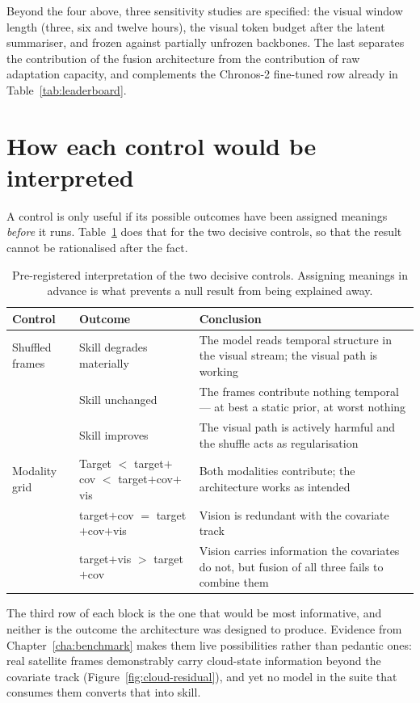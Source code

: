 Beyond the four above, three sensitivity studies are specified: the visual window length
(three, six and twelve hours), the visual token budget after the latent summariser, and
frozen against partially unfrozen backbones. The last separates the contribution of the
fusion architecture from the contribution of raw adaptation capacity, and complements the
Chronos-2 fine-tuned row already in Table~\ref{tab:leaderboard}.

\section{How each control would be interpreted}
\label{sec:control-logic}

A control is only useful if its possible outcomes have been assigned meanings \emph{before}
it runs. Table~\ref{tab:control-logic} does that for the two decisive controls, so that the
result cannot be rationalised after the fact.

\begin{table}[h!]
\centering
\small
\begin{tabular}{p{3.4cm} p{4.6cm} p{5.4cm}}
\hline
\textbf{Control} & \textbf{Outcome} & \textbf{Conclusion} \\
\hline
Shuffled frames & Skill degrades materially & The model reads temporal structure in the
visual stream; the visual path is working \\
 & Skill unchanged & The frames contribute nothing temporal --- at best a static prior, at
worst nothing \\
 & Skill improves & The visual path is actively harmful and the shuffle acts as
regularisation \\
\hline
Modality grid & Target $<$ target$+$cov $<$ target$+$cov$+$vis & Both modalities contribute;
the architecture works as intended \\
 & target$+$cov $=$ target$+$cov$+$vis & Vision is redundant with the covariate track \\
 & target$+$vis $>$ target$+$cov & Vision carries information the covariates do not, but
fusion of all three fails to combine them \\
\hline
\end{tabular}
\caption{Pre-registered interpretation of the two decisive controls. Assigning meanings in
advance is what prevents a null result from being explained away.}
\label{tab:control-logic}
\end{table}

The third row of each block is the one that would be most informative, and neither is the
outcome the architecture was designed to produce. Evidence from
Chapter~\ref{cha:benchmark} makes them live possibilities rather than pedantic ones: real
satellite frames demonstrably carry cloud-state information beyond the covariate track
(Figure~\ref{fig:cloud-residual}), and yet no model in the suite that consumes them converts
that into skill.

